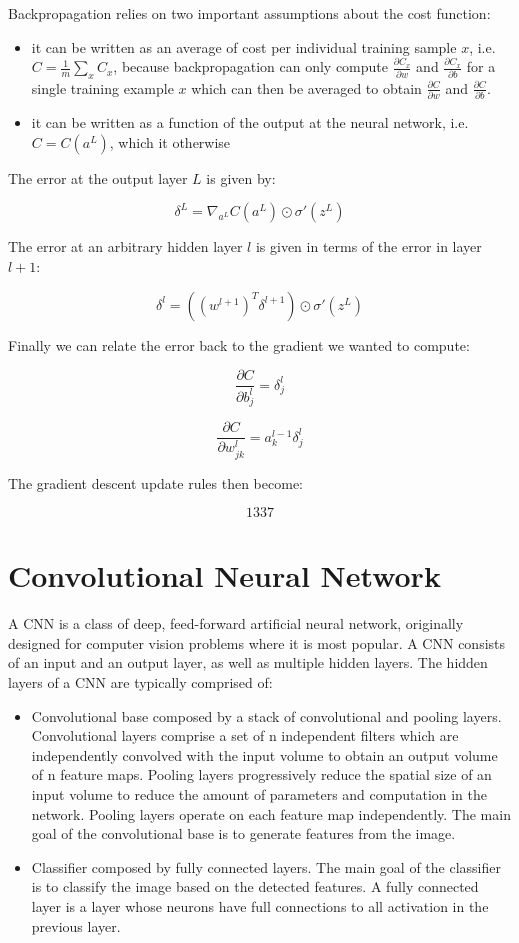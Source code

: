 Backpropagation relies on two important assumptions about the cost function:

\begin{itemize}
    \item it can be written as an average of cost per individual training sample $x$, i.e. $C = \frac{1}{m} \sum_x C_x$, because backpropagation can only compute $\frac{\partial C_x}{\partial w}$  and $\frac{\partial C_x}{\partial b}$ for a single training example $x$ which can then be averaged to obtain $\frac{\partial C}{\partial w}$  and $\frac{\partial C}{\partial b}$.
    \item it can be written as a function of the output at the neural network, i.e. $C = C(a^{L})$, which it otherwise
\end{itemize}

The error at the output layer $L$ is given by:

$$
\delta^L = \nabla_{a^L} C(a^L) \odot \sigma'(z^L)
$$

The error at an arbitrary hidden layer $l$ is given in terms of the error in layer $l+1$:

$$
\delta^l = ((w^{l+1})^T \delta^{l+1}) \odot \sigma'(z^L)
$$

Finally we can relate the error back to the gradient we wanted to compute:

$$
\frac{\partial C}{\partial b^l_j} = \delta^l_j
$$

$$
\frac{\partial C}{\partial w^l_{jk}} = a^{l-1}_k \delta^l_j
$$

The gradient descent update rules then become:

$$
1337
$$

\section{Convolutional Neural Network}

A \ac{CNN} is a class of deep, feed-forward artificial neural network, originally designed for computer vision problems where it is most popular. A \ac{CNN} consists of an input and an output layer, as well as multiple hidden layers. The hidden layers of a \ac{CNN} are typically comprised of:

\begin{itemize}
    \item Convolutional base composed by a stack of convolutional and pooling layers. Convolutional layers comprise a set of n independent filters which are independently convolved with the input volume to obtain an output volume of n feature maps. Pooling layers progressively reduce the spatial size of an input volume to reduce the amount of parameters and computation in the network. Pooling layers operate on each feature map independently. The main goal of the convolutional base is to generate features from the image.
    \item Classifier composed by fully connected layers. The main goal of the classifier is to classify the image based on the detected features. A fully connected layer is a layer whose neurons have full connections to all activation in the previous layer.
\end{itemize}

